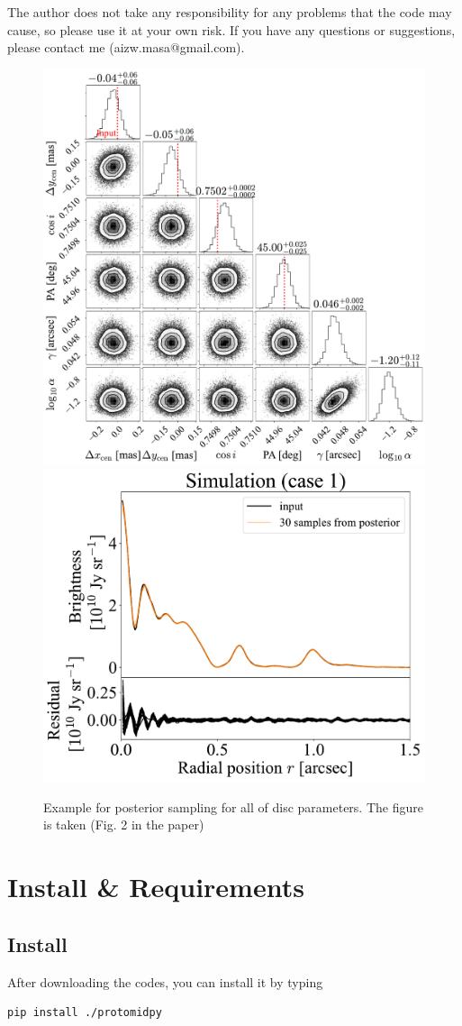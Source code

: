 \documentclass{report}
\begin{document}
The author does not take any responsibility for any problems that the code may cause, so please use it at your own risk. If you have any questions or suggestions, please contact me (aizw.masa@gmail.com).
\begin{figure}
\begin{center}
\includegraphics[width=0.48\linewidth]{./fig/recovered_sim_mcmc.pdf}
\includegraphics[width=0.48\linewidth]{./fig/posterior_sim.pdf}
\end{center}
\caption{Example for posterior sampling for all of disc parameters. The figure is taken \protect \cite{aizawa2024} (Fig. 2 in the paper)}
\label{fig:posterior_sim}
\end{figure}


\chapter{Install \& Requirements \label{sec:reuired}}
\section{Install}
After downloading the codes, you can install it by typing 
\begin{verbatim}
pip install ./protomidpy
\end{verbatim}
\end{document}
